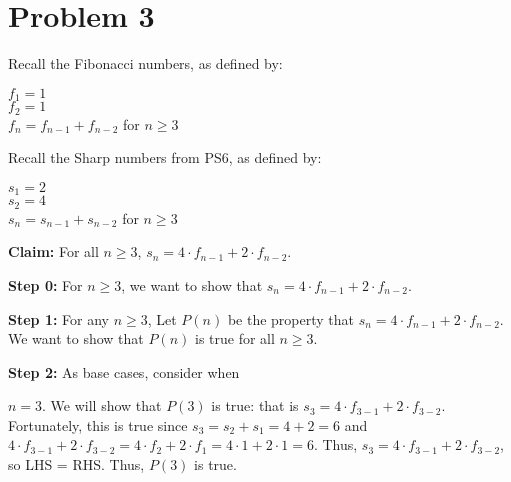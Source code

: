\documentclass{article}
\begin{document}
\section{Problem 3}

Recall the Fibonacci numbers, as defined by:
\begin{center}
    \begin{minipage}{0.5\textwidth} %
        \raggedright %
        $f_1=1$ \\
        $f_2=1$ \\
        $f_n=f_{n-1}+f_{n-2}$ for $n\geq 3$
    \end{minipage}
\end{center}
\vspace{10pt}

\noindent Recall the Sharp numbers from PS6, as defined by:
\begin{center}
    \begin{minipage}{0.5\textwidth} %
        \raggedright %
		$s_1=2$ \\
		$s_2=4$ \\
		$s_n=s_{n-1}+s_{n-2}$ for $n\geq 3$
    \end{minipage}
\end{center}
\vspace{15pt}

\noindent\textbf{Claim:} For all $n\geq 3$, $s_n=4\cdot f_{n-1}+2\cdot f_{n-2}$.

\vspace{15pt}

\noindent\textbf{Step 0:} For $n\geq 3$, we want to show that $s_n=4\cdot f_{n-1}+2\cdot f_{n-2}$.
\vspace{15pt}

\noindent\textbf{Step 1:} For any $n\geq 3$, Let $P(n)$ be the property that $s_n=4\cdot f_{n-1}+2\cdot f_{n-2}$.
\vspace{5pt}
We want to show that $P(n)$ is true for all $n\geq 3$.

\vspace{15pt}

\noindent\textbf{Step 2:} As base cases, consider when\vspace{10pt}

$n=3$. We will show that $P(3)$ is true: that is $s_3=4\cdot f_{3-1}+2\cdot f_{3-2}$. Fortunately, this is true since $s_3=s_2+s_1=4+2=6$ and $4\cdot f_{3-1}+2\cdot f_{3-2}=4\cdot f_2+2\cdot f_1=4\cdot 1+2\cdot 1=6$. Thus, $s_3=4\cdot f_{3-1}+2\cdot f_{3-2}$, so LHS = RHS. Thus, $P(3)$ is true.
\end{document}

